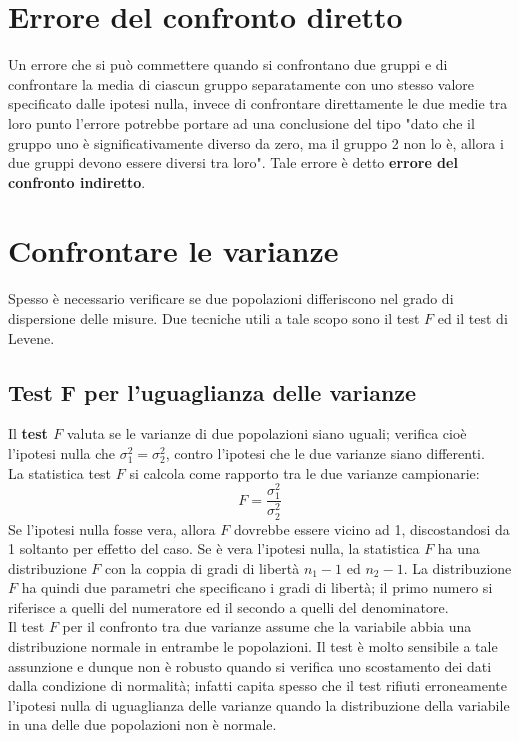 \documentclass[10pt, draft]{book}
\begin{document}
\section{Errore del confronto diretto}

Un errore che si può commettere quando si confrontano due gruppi e di confrontare la media di ciascun gruppo separatamente con uno stesso valore specificato dalle ipotesi nulla, invece di confrontare direttamente le due medie tra loro punto l'errore potrebbe portare ad una conclusione del tipo "dato che il gruppo uno è significativamente diverso da zero, ma il gruppo 2 non lo è, allora i due gruppi devono essere diversi tra loro". Tale errore è detto \textbf{errore del confronto indiretto}.

\section{Confrontare le varianze}

Spesso è necessario verificare se due popolazioni differiscono nel grado di dispersione delle misure. Due tecniche utili a tale scopo sono il test $F$ ed il test di Levene.

\subsection{Test \texorpdfstring{F}{Lg} per l'uguaglianza delle varianze}

Il \textbf{test $F$} valuta se le varianze di due popolazioni siano uguali; verifica cioè l'ipotesi nulla che $\sigma_1^2 = \sigma_2^2$, contro l'ipotesi che le due varianze siano differenti.
\\
La statistica test $F$ si calcola come rapporto tra le due varianze campionarie:
\begin{equation}
    F = \frac{\sigma_1^2}{\sigma_2^2}
\end{equation}
Se l'ipotesi nulla fosse vera, allora $F$ dovrebbe essere vicino ad 1, discostandosi da 1 soltanto per effetto del caso. Se è vera l'ipotesi nulla, la statistica $F$ ha una distribuzione $F$ con la coppia di gradi di libertà $n_1-1$ ed $n_2-1$. La distribuzione $F$ ha quindi due parametri che specificano i gradi di libertà; il primo numero si riferisce a quelli del numeratore ed il secondo a quelli del denominatore.
\\
Il test $F$ per il confronto tra due varianze assume che la variabile abbia una distribuzione normale in entrambe le popolazioni. Il test è molto sensibile a tale assunzione e dunque non è robusto quando si verifica uno scostamento dei dati dalla condizione di normalità; infatti capita spesso che il test rifiuti erroneamente l'ipotesi nulla di uguaglianza delle varianze quando la distribuzione della variabile in una delle due popolazioni non è normale.
\end{document}
